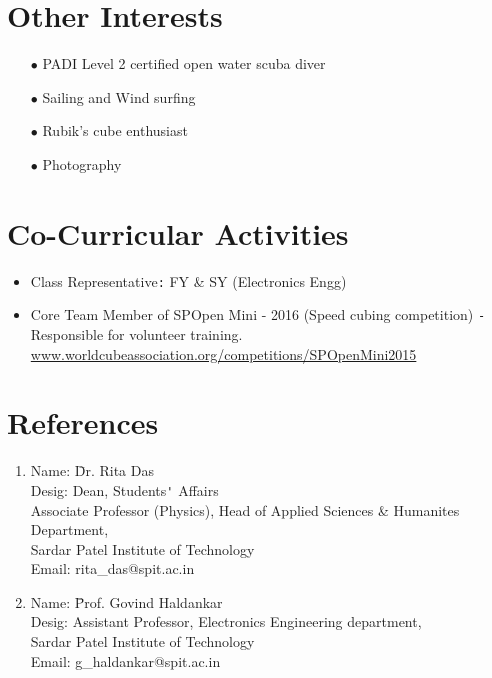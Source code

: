 \documentclass{article}
\begin{document}
	\section*{Other Interests}
	\begin{itemize}
		\item[$\bullet$] PADI Level 2 certified open water scuba diver
		\item[$\bullet$] Sailing and Wind surfing
		\item[$\bullet$] Rubik’s cube enthusiast 
		\item[$\bullet$] Photography 
	\end{itemize}
	
	\section*{Co-Curricular Activities}
	\begin{itemize}
		\item Class Representative\verb|:| FY \& SY (Electronics Engg) 
		\item Core Team Member of SPOpen Mini - 2016 (Speed cubing competition) \verb|-|Responsible for volunteer training.\\
		\url{www.worldcubeassociation.org/competitions/SPOpenMini2015}
	\end{itemize}
		
	\section*{References}
	\begin{enumerate}
		\item
		\begin{tabbing}
			Name: 		 \=Dr. Rita Das\\ 
			Desig: \>Dean, Students\verb|'| Affairs\\
			\>Associate Professor (Physics), Head of Applied Sciences \& Humanites Department,\\
			\>Sardar Patel Institute of Technology\\
			Email: \>rita\_das@spit.ac.in\\ 
		\end{tabbing}
		
		\item
		\begin{tabbing}
			Name: 	 \=Prof. Govind Haldankar\\
			Desig:
			\>Assistant Professor, Electronics Engineering department,\\
			\>Sardar Patel Institute of Technology\\  
			Email: \>g\_haldankar@spit.ac.in\\ 
		\end{tabbing}	
		
	\end{enumerate}
	
\end{document}
